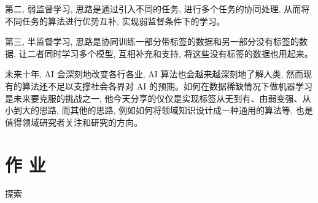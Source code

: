 第二, 弱监督学习, 思路是通过引入不同的任务, 进行多个任务的协同处理, 从而将不同任务的算法进行优势互补, 实现弱监督条件下的学习。

第三, 半监督学习, 思路是协同训练一部分带标签的数据和另一部分没有标签的数据, 让二者同时学习多个模型, 互相补充和支持, 将这些没有标签的数据也用起来。

未来十年, AI 会深刻地改变各行各业, AI 算法也会越来越深刻地了解人类, 然而现有的算法还不足以支撑社会各界对 AI 的预期。如何在数据稀缺情况下做机器学习是未来要克服的挑战之一, 他今天分享的仅仅是实现标签从无到有、由弱变强、从小到大的思路, 而其他的思路, 例如如何将领域知识设计成一种通用的算法等, 也是值得领域研究者关注和研究的方向。

\section{作 业 }
\begin{custom}[explorecolor]{探索}

\end{custom}

\begin{think}
  
\end{think}